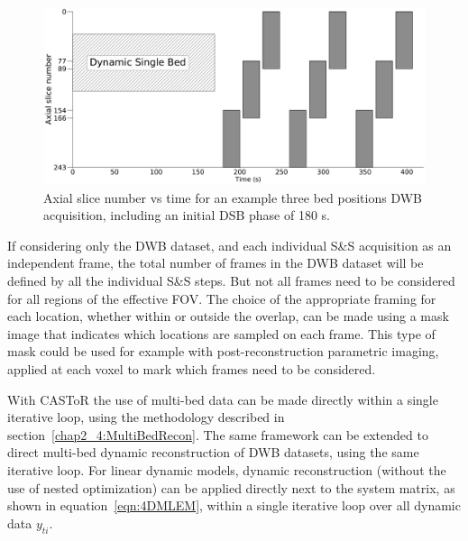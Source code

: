 \begin{figure} [ht!]
\centering
\includegraphics[scale=0.28,angle=0]{3_Results/3_3_DWB_Reconstruction/figures/CompleteProtocolTiming.pdf}
\caption{Axial slice number vs time for an example three bed positions DWB acquisition, including an initial DSB phase of 180 s.}
\label{fig_3_3:CompleteProtocolFraming}
\end{figure} 

If considering only the DWB dataset, and each individual S\&S acquisition as an independent frame, the total number of frames in the DWB dataset will be defined by all the individual S\&S steps.
But not all frames need to be considered for all regions of the effective FOV. 
The choice of the appropriate framing for each location, whether within or outside the overlap, can be made using a mask image that indicates which locations are sampled on each frame. This type of mask could be used for example with post-reconstruction parametric imaging, applied at each voxel to mark which frames need to be considered.

With CASToR the use of multi-bed data can be made directly within a single iterative loop, using the methodology described in section~\ref{chap2_4:MultiBedRecon}. The same framework can be extended to direct multi-bed dynamic reconstruction of DWB datasets, using the same iterative loop. 
For linear dynamic models, dynamic reconstruction (without the use of nested optimization) can be applied directly next to the system matrix, as shown in equation~\ref{eqn:4DMLEM}, within a single iterative loop over all dynamic data $y_{ti}$. 

